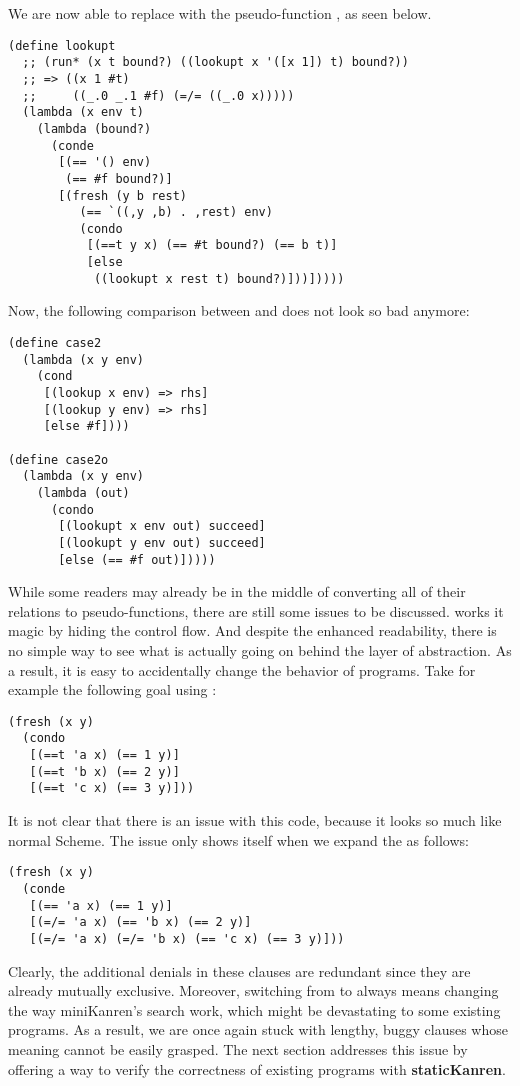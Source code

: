 We are now able to replace  with the pseudo-function , as seen below.
\begin{lstlisting}
(define lookupt
  ;; (run* (x t bound?) ((lookupt x '([x 1]) t) bound?))
  ;; => ((x 1 #t)
  ;;     ((_.0 _.1 #f) (=/= ((_.0 x)))))
  (lambda (x env t)
    (lambda (bound?)
      (conde
       [(== '() env)
        (== #f bound?)]
       [(fresh (y b rest)
          (== `((,y ,b) . ,rest) env)
          (condo
           [(==t y x) (== #t bound?) (== b t)]
           [else
            ((lookupt x rest t) bound?)]))]))))
\end{lstlisting}
Now, the following comparison between  and  does not look so bad anymore:
\begin{lstlisting}
(define case2
  (lambda (x y env)
    (cond
     [(lookup x env) => rhs]
     [(lookup y env) => rhs]
     [else #f])))

(define case2o
  (lambda (x y env)
    (lambda (out)
      (condo
       [(lookupt x env out) succeed]
       [(lookupt y env out) succeed]
       [else (== #f out)]))))
\end{lstlisting}

While some readers may already be in the middle of converting all of their relations to pseudo-functions, there are still some issues to be discussed.  works it magic by hiding the control flow. And despite the enhanced readability, there is no simple way to see what is actually going on behind the layer of abstraction. As a result, it is easy to accidentally change the behavior of programs. Take for example the following goal using :
\begin{lstlisting}
(fresh (x y)
  (condo
   [(==t 'a x) (== 1 y)]
   [(==t 'b x) (== 2 y)]
   [(==t 'c x) (== 3 y)]))
\end{lstlisting}
It is not clear that there is an issue with this code, because it looks so much like normal Scheme. The issue only shows itself when we expand the  as follows:
\begin{lstlisting}
(fresh (x y)
  (conde
   [(== 'a x) (== 1 y)]
   [(=/= 'a x) (== 'b x) (== 2 y)]
   [(=/= 'a x) (=/= 'b x) (== 'c x) (== 3 y)]))
\end{lstlisting}
Clearly, the additional denials in these  clauses are redundant since they are already mutually exclusive. Moreover, switching from  to  always means changing the way miniKanren's search work, which might be devastating to some existing programs. As a result, we are once again stuck with lengthy, buggy  clauses whose meaning cannot be easily grasped. The next section addresses this issue by offering a way to verify the correctness of existing programs with \textbf{staticKanren}.